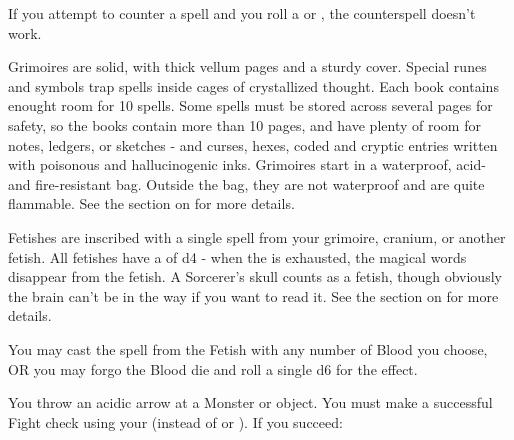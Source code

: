 {If you attempt to counter a spell and you roll a
 or , the
counterspell doesn't work. 



Grimoires are solid, with thick vellum pages and a sturdy cover. Special
runes and symbols trap spells inside cages of crystallized thought. Each
book contains enought room for 10 spells. Some spells must be stored across
several pages for safety, so the books contain more than 10 pages, and have
plenty of room for notes, ledgers, or sketches - and curses, hexes, coded
and cryptic entries written with poisonous and hallucinogenic inks.
Grimoires start in a waterproof, acid- and fire-resistant bag. Outside the
bag, they are not waterproof and are quite flammable. See the section on
 for more details.

\cbreak


Fetishes are inscribed with a single spell from your grimoire, cranium, or
another fetish.  All fetishes have a \UD of d4 - when the \UD is exhausted,
the magical words disappear from the fetish.  A Sorcerer's skull counts as a
fetish, though obviously the brain can't be in the way if you want to read
it.  See the section on  for more
details.

You may cast the spell from the Fetish with any number of Blood you choose,
OR you may forgo the Blood die and roll a single d6 for the effect.  

\newpage


\SPELL[
  Name=Acid Arrow,
  Link=wizardry-acid-arrow,
  Paradigm=Elements,
  Save=N,
  Duration=0/Markovian,
  Counter=None,
  Keywords=None,
  Target=Nearby or Far-Away Monster or Object
]

You throw an acidic arrow at a Monster or object. You must make a successful
Fight check using your \INT (instead of \VIG or \DEX).  If you succeed: 


}
